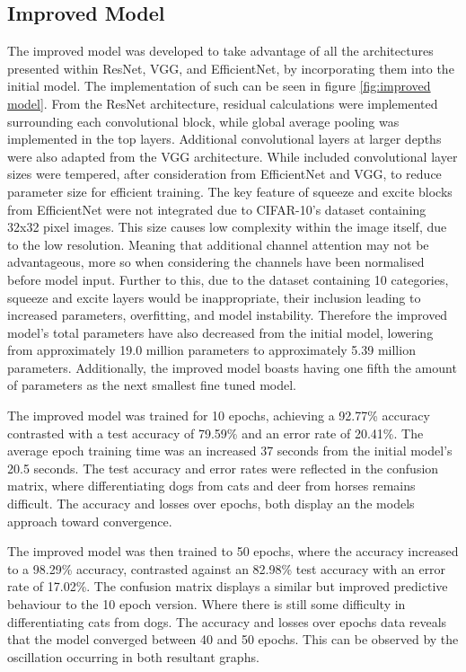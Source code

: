 \documentclass[10pt,twocolumn,letterpaper]{article}
\begin{document}
\subsection{Improved Model}
The improved model was developed to take advantage of all the architectures presented within ResNet, VGG, and EfficientNet, by incorporating them into the initial model. The implementation of such can be seen in figure \ref{fig:improved model}. From the ResNet architecture, residual calculations were implemented surrounding each convolutional block, while global average pooling was implemented in the top layers. Additional convolutional layers at larger depths were also adapted from the VGG architecture. While included convolutional layer sizes were tempered, after consideration from EfficientNet and VGG, to reduce parameter size for efficient training. The key feature of squeeze and excite blocks from EfficientNet were not integrated due to CIFAR-10's dataset containing 32x32 pixel images. This size causes low complexity within the image itself, due to the low resolution. Meaning that additional channel attention may not be advantageous, more so when considering the channels have been normalised before model input. Further to this, due to the dataset containing 10 categories, squeeze and excite layers would be inappropriate, their inclusion leading to increased parameters, overfitting, and model instability. Therefore the improved model's total parameters have also decreased from the initial model, lowering from approximately 19.0 million parameters to approximately 5.39 million parameters. Additionally, the improved model boasts having one fifth the amount of parameters as the next smallest fine tuned model. 

The improved model was trained for 10 epochs, achieving a 92.77\% accuracy contrasted with a test accuracy of 79.59\% and an error rate of 20.41\%. The average epoch training time was an increased 37 seconds from the initial model's 20.5 seconds. The test accuracy and error rates were reflected in the confusion matrix, where differentiating dogs from cats and deer from horses remains difficult. The accuracy and losses over epochs, both display an the models approach toward convergence.

The improved model was then trained to 50 epochs, where the accuracy increased to a  98.29\% accuracy, contrasted against an 82.98\% test accuracy with an error rate of 17.02\%. The confusion matrix displays a similar but improved predictive behaviour to the 10 epoch version. Where there is still some difficulty in differentiating cats from dogs. The accuracy and losses over epochs data reveals that the model converged between 40 and 50 epochs. This can be observed by the oscillation occurring in both resultant graphs.
\end{document}
